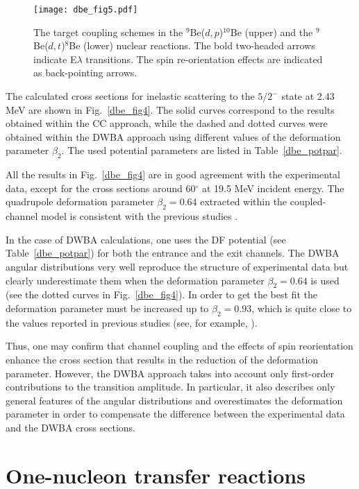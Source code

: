 \documentclass[
12pt, %
oneside, %
english, %
doublespacing, %
doublespacing, %
toctotoc, %
parskip, %
headsepline, %
]{MastersDoctoralThesis} %
\begin{document}
\begin{figure}[bp]
\centering
\texttt{[image: dbe\_fig5.pdf]}
\decoRule
\caption{ \label{dbe_fig5}  The target coupling schemes in the ${}^9$Be($d,p$)$^{10}$Be (upper) and the ${}^9$Be($d,t$)$^8$Be (lower) nuclear reactions. The bold two-headed arrows indicate E$\lambda$ transitions. The spin re-orientation effects are indicated as back-pointing arrows.}
\end{figure} 

The calculated cross sections for inelastic scattering to the $5/2^-$ state at 2.43 MeV are shown in Fig.~\ref{dbe_fig4}. The solid curves correspond to the results obtained within the CC approach, while the dashed and dotted curves were obtained within the DWBA approach using  different values of the deformation parameter $\beta_2$. The used potential parameters are listed in Table~\ref{dbe_potpar}.


All the results in Fig.~\ref{dbe_fig4} are in good agreement with the experimental data, except for the cross sections around 60$^\circ$ at 19.5 MeV incident energy. The quadrupole deformation parameter $\beta_2 = 0.64$ extracted within the coupled-channel model is consistent with the previous studies \cite{lukyanov2014study, harakeh1980strong}.

In the case of DWBA calculations, one uses the DF potential (see Table~\ref{dbe_potpar}) for both the entrance and the exit channels. The DWBA angular distributions very well reproduce the structure of experimental data but clearly underestimate them when the deformation parameter $\beta_2 = 0.64$ is used (see the dotted curves in Fig.~\ref{dbe_fig4}). In order to get the best fit the deformation parameter must be increased up to $\beta_2 = 0.93$, which is quite close to the values reported in previous studies (see, for example, \cite{bodek1989, votava1973}).

Thus, one may confirm that channel coupling and the effects of spin reorientation enhance the cross section that results in the reduction of the deformation parameter. However, the DWBA approach takes into account only first-order contributions to the transition amplitude. In particular, it also describes only general features of the angular distributions and overestimates the deformation parameter in order to compensate the difference between the experimental data and the DWBA cross sections.

\section{One-nucleon transfer reactions }
\end{document}
